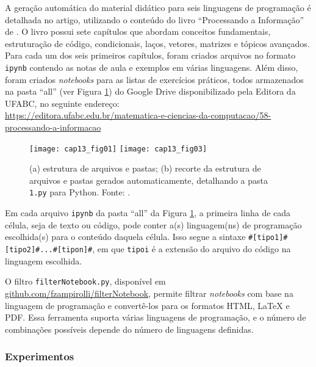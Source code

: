 A geração automática do material didático para seis linguagens de programação é detalhada no artigo, utilizando o conteúdo do livro ``Processando a Informação'' de . O livro possui sete capítulos que abordam conceitos fundamentais, estruturação de código, condicionais, laços, vetores, matrizes e tópicos avançados. Para cada um dos seis primeiros capítulos, foram criados arquivos no formato \verb|ipynb| contendo as notas de aula e exemplos em várias linguagens. Além disso, foram criados \textit{notebooks} para as listas de exercícios práticos, todos armazenados na pasta ``all'' (ver Figura \ref{fig:pastaAll}) do Google Drive disponibilizado pela Editora da UFABC, no seguinte endereço:\\

\noindent
\url{https://editora.ufabc.edu.br/matematica-e-ciencias-da-computacao/58-processando-a-informacao}\\

\begin{figure}[!ht]
\centering
\raisebox{15.3\height}{(a)}\texttt{[image: cap13\_fig01]}
\raisebox{15.3\height}{(b)}\texttt{[image: cap13\_fig03]} 
\caption{(a) estrutura de arquivos e pastas; (b) recorte da estrutura de arquivos e pastas gerados automaticamente, detalhando a pasta \texttt{1.py} para Python. Fonte: .}
\label{fig:pastaAll}
\end{figure}

  
Em cada arquivo \verb|ipynb| da pasta ``all'' da Figura \ref{fig:pastaAll}, a primeira linha de cada célula, seja de texto ou código, pode conter a(s) linguagem(ns) de programação escolhida(s) para o conteúdo daquela célula. Isso segue a sintaxe \verb|#[tipo1]#[tipo2]#...#[tipon]#|, em que \verb|tipoi| é a extensão do arquivo do código na linguagem escolhida.

O filtro \verb|filterNotebook.py|, disponível em \href{https://github.com/fzampirolli/filterNotebook}{github.com/fzampirolli/filterNotebook}, permite filtrar \textit{notebooks} com base na linguagem de programação e convertê-los para os formatos HTML, LaTeX e PDF. Essa ferramenta suporta várias linguagens de programação, e o número de combinações possíveis depende do número de linguagens definidas.


\subsubsection{Experimentos}

